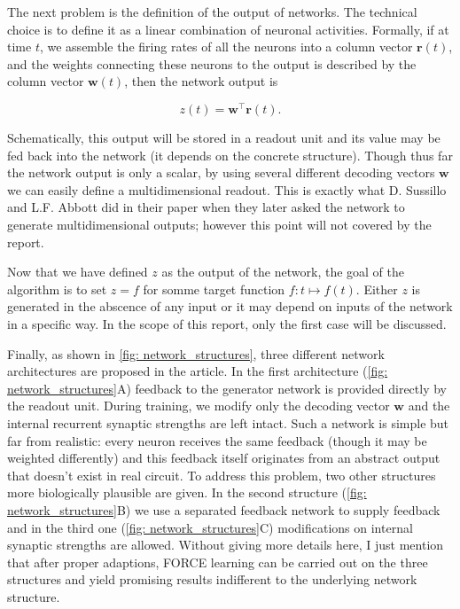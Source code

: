 The next problem is the definition of the output of networks. The
technical choice is to define it as a linear combination of neuronal
activities. Formally, if at time $t$, we assemble the firing rates of all
the neurons into a column vector $\mathbf{r}(t)$, and the weights 
connecting these neurons to the output is described by the column vector
$\mathbf{w}(t)$, then the network output is

\[z(t) = \mathbf{w}^{\top}\mathbf{r}(t).\]

Schematically, this output will be stored in a readout unit and its
value may be fed back into the network (it depends on the concrete
structure). Though thus far the network output is only a scalar, by using
several different decoding vectors $\mathbf{w}$ we can easily define
a multidimensional readout. This is exactly what D. Sussillo and L.F.
Abbott did in their paper when they later asked the network to generate
multidimensional outputs; however this point will not covered by the report.

Now that we have defined $z$ as the output of the network, the goal
of the algorithm is to set $z = f$ for somme target function 
$f: t \mapsto f(t)$. Either $z$ is generated in the abscence of any input
or it may depend on inputs of the network in a specific way. In the scope
of this report, only the first case will be discussed.

Finally, as shown in \autoref{fig: network_structures}, three different 
network architectures are proposed in the article. In the first architecture
(\autoref{fig: network_structures}A)
feedback to the generator network is provided directly by the readout
unit. During training, we modify only the decoding vector $\mathbf{w}$
and the internal recurrent synaptic strengths are left intact.
Such a network is simple but far from realistic: every neuron receives the
same feedback (though it may be weighted differently) and this feedback
itself originates from an abstract output that doesn't exist in real circuit.
To address this problem, two other structures more biologically plausible
are given. In the second structure (\autoref{fig: network_structures}B)
we use a separated feedback network to supply feedback and in the third one 
(\autoref{fig: network_structures}C) modifications on internal synaptic
strengths are allowed. Without giving more details here, I just mention 
that after proper adaptions, FORCE learning can be carried out on the
three structures and yield promising results indifferent to the
underlying network structure.

